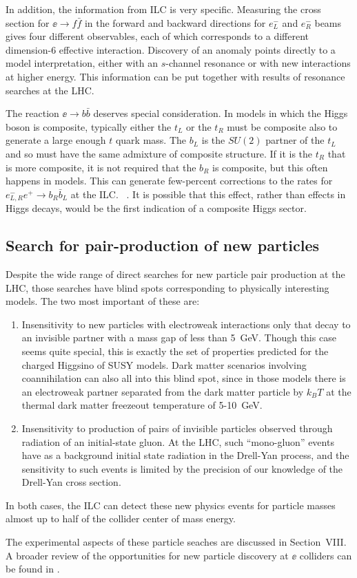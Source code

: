  In addition, the information from ILC is very specific.   Measuring the cross section for $\ee\to f\bar f$ in the forward and backward directions for $e^-_L$ and $e^-_R$ beams gives four  different observables, each of which corresponds to a different dimension-6 effective  interaction.   Discovery of an anomaly points directly to a model interpretation, either with an $s$-channel resonance or with new interactions at higher energy.   This information can be put together with results of resonance searches at the LHC. 

The reaction $\ee\to b\bar b$ deserves special consideration. In models in which the Higgs boson is composite, typically either the $t_L$ or the $t_R$ must be composite also to generate a large enough $t$ quark mass.    The $b_L$ is the $SU(2)$ partner of the $t_L$ and so must have the same admixture of composite structure.    If it is the $t_R$ that is more composite, it is not required that the $b_R$ is composite, but this often happens in models.  This can generate few-percent corrections to the rates for $e^-_{L,R} e^+\to b_R\bar b_L$ at the ILC.  ~\cite{Funatsu:2017nfm,YoonPeskin}.   It is possible that this effect, rather than effects in Higgs decays, would be the first indication of a composite Higgs sector. 

     
\subsection{Search for pair-production of new particles}

Despite the wide range of direct searches for new particle pair production at the LHC, 
those searches have blind spots corresponding to physically interesting models.  The two most important of these are:
\begin{enumerate}
\item  Insensitivity to new particles with electroweak interactions only that decay to an invisible partner with a mass gap of less than 5~GeV.   Though this case seems quite special, this is exactly the set of properties predicted for the charged Higgsino of SUSY models.  Dark matter scenarios involving coannihilation can also all into this blind spot, since in those models there is an electroweak partner separated from the dark matter particle by $k_B T$ at the thermal dark matter freezeout temperature of 5-10~GeV.
\item Insensitivity to production of pairs of invisible particles observed through radiation of an initial-state gluon.   At the LHC, such ``mono-gluon'' events have as a background initial state radiation in the Drell-Yan process, and the sensitivity to such events is limited by the precision of our knowledge of the Drell-Yan cross section.
\end{enumerate}
In both cases, the ILC can detect these new physics events for particle masses almost up to half of  the collider center of mass energy.

The experimental aspects of these particle seaches are discussed in Section~VIII.  A broader review of the opportunities for new particle discovery at $\ee$ colliders can be found in \cite{Fujii:2017ekh}.
